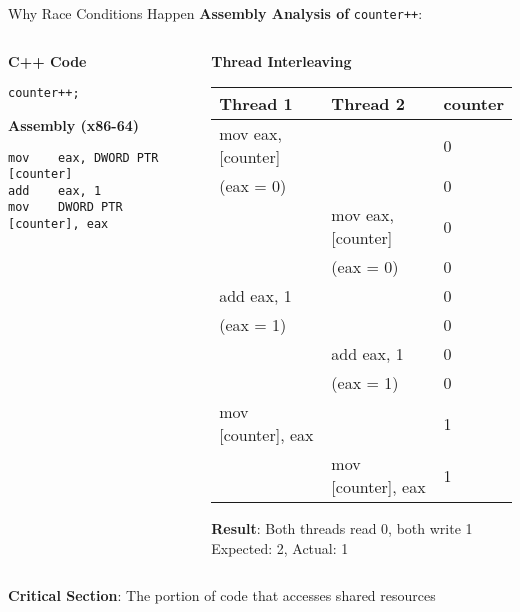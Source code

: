\begin{frame}[fragile]{ Why Race Conditions Happen}
	\textbf{Assembly Analysis of} \texttt{counter++}:

	\begin{columns}
		\begin{column}{0.5\textwidth}
			\textbf{C++ Code}
			\begin{verbatim}
counter++;
			\end{verbatim}

			\vspace{1em}
			\textbf{Assembly (x86-64)}
			\begin{verbatim}
mov    eax, DWORD PTR [counter]
add    eax, 1
mov    DWORD PTR [counter], eax
			\end{verbatim}
		\end{column}
		\begin{column}{0.5\textwidth}
			\textbf{Thread Interleaving}
			\begin{table}[h]
				\tiny
				\begin{tabular}{|l|l|l|}
					\hline
					\textbf{Thread 1}  & \textbf{Thread 2}  & \textbf{counter} \\
					\hline
					mov eax, [counter] &                    & 0                \\
					(eax = 0)          &                    & 0                \\
					                   & mov eax, [counter] & 0                \\
					                   & (eax = 0)          & 0                \\
					add eax, 1         &                    & 0                \\
					(eax = 1)          &                    & 0                \\
					                   & add eax, 1         & 0                \\
					                   & (eax = 1)          & 0                \\
					mov [counter], eax &                    & 1                \\
					                   & mov [counter], eax & 1                \\
					\hline
				\end{tabular}
			\end{table}

			\textbf{Result}: Both threads read 0, both write 1
			\\Expected: 2, Actual: 1
		\end{column}
	\end{columns}

	\vspace{0.5em}
	\textbf{Critical Section}: The portion of code that accesses shared resources
\end{frame}

